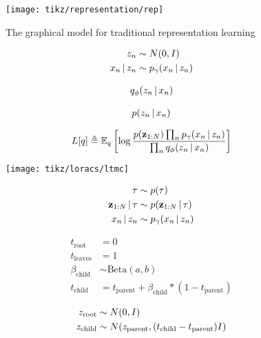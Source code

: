 \begin{figure}[htp!]
    \centering
    \texttt{[image: tikz/representation/rep]}
    \caption{The graphical model for traditional representation learning}
    \label{fig:graphical-model-rep}
\end{figure}

\begin{align*}
    z_n &\sim N(0, I) \\
    x_n \,|\, z_n &\sim p_\gamma(x_n \,|\, z_n)
\end{align*}

\begin{align*}
  q_\phi(z_n \,|\, x_n)
\end{align*}

\begin{align*}
  p(z_n \,|\, x_n)
\end{align*}

\begin{align*}
  L[q] \triangleq \mathbb{E}_q\left[\log \frac{p(\mathbf{z}_{1:N})\prod_n p_\gamma(x_n \,|\, z_n)}{\prod_n q_\phi(z_n \,|\, x_n)}\right]
\end{align*}

\begin{figure}
    \texttt{[image: tikz/loracs/ltmc]}
\end{figure}

\begin{align*}
    \tau &\sim p(\tau) \\
    \mathbf{z}_{1:N} \,|\, \tau &\sim p(\mathbf{z}_{1:N} \,|\, \tau) \\
    x_n \,|\, z_n &\sim p_\gamma(x_n \,|\, z_n)
\end{align*}

\begin{align*}
    t_{\textrm{root}} &= 0 \\
    t_{\textrm{leaves}} &= 1 \\
    \beta_{\textrm{child}} &\sim \textrm{Beta}(a, b)\\
    t_{\textrm{child}} &= t_{\textrm{parent}} + \beta_{\textrm{child}} * (1 - t_{\textrm{parent}})
\end{align*}

\begin{align*}
    z_{\textrm{root}} &\sim N(0, I) \\
    z_{\textrm{child}} &\sim N(z_{\textrm{parent}}, (t_{\textrm{child}} - t_{\textrm{parent}}) I)
\end{align*}

